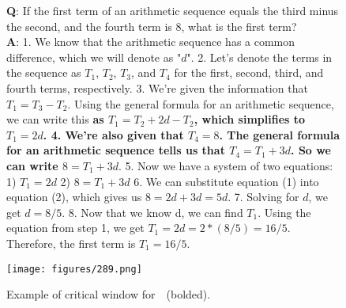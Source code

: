 \begin{figure}[h]
\centering
\begin{minipage}{0.7\linewidth}
    \centering
    \begin{tcolorbox}[enhanced,colback=blue!5!white,colframe=blue!75!black,title=MATH (\phiinstruct)
        ]
    {\small \textbf{Q}: If the first term of an arithmetic sequence equals the third minus the second, and the fourth term is $8$, what is the first term?\\[0.1em]
    \textbf{A}: 1. We know that the arithmetic sequence has a common difference, which we will denote as "$d$". 2. Let's denote the terms in the sequence as $T_1$, $T_2$, $T_3$, and $T_4$ for the first, second, third, and fourth terms, respectively. 3. We're given the information that $T_1 = T_3 - T_2$. Using the general formula for an arithmetic sequence, we can write this \textbf{as $T_1 = T_2 + 2d - T_2$, which simplifies to $T_1 = 2d$. 4. We're also given that $T_4 = 8$. The general formula for an arithmetic sequence tells us that $T_4 = T_1 + 3d$. So we can write $8$}$ = T_1 + 3d.$ 5. Now we have a system of two equations: 1) $T_1 = 2d$ 2) $8 = T_1 + 3d$ 6. We can substitute equation (1) into equation (2), which gives us $8 = 2d + 3d = 5d$. 7. Solving for $d$, we get $d = 8/5$. 8. Now that we know d, we can find $T_1$. Using the equation from step 1, we get $T_1 = 2d = 2 * (8/5) = 16/5$. Therefore, the first term is $T_1 = 16/5$.}
    \end{tcolorbox}
\end{minipage}
\hfill
\begin{minipage}{0.29\linewidth}
    \centering
    \texttt{[image: figures/289.png]}
\end{minipage}
\caption{Example of critical window for~\phiinstruct~(bolded).}
\label{fig:cw_diff_combined}
\end{figure}
